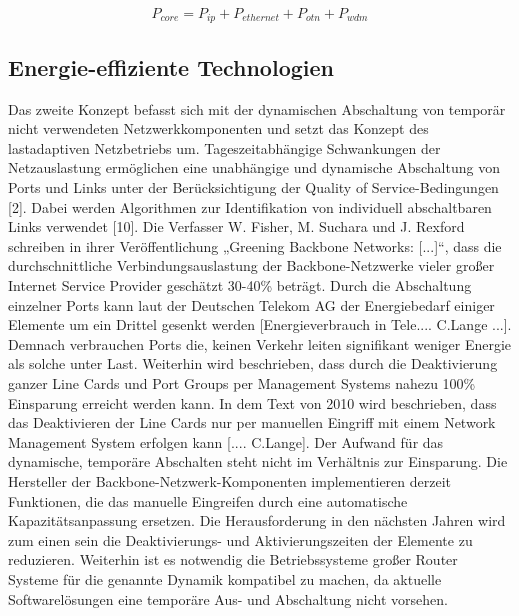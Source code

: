 \documentclass[12pt,titlepage]{article}
\begin{document}
\begin{equation}
P_{core} = P_{ip} + P_{ethernet} + P_{otn} + P_{wdm}
\end{equation}


\subsection{Energie-effiziente Technologien}
Das zweite Konzept befasst sich mit der dynamischen Abschaltung von temporär nicht verwendeten Netzwerkkomponenten und setzt das Konzept des lastadaptiven Netzbetriebs um.  Tageszeitabhängige Schwankungen der Netzauslastung ermöglichen eine unabhängige und dynamische Abschaltung von Ports und Links unter der Berücksichtigung der Quality of Service-Bedingungen [2]. Dabei werden Algorithmen zur Identifikation von individuell abschaltbaren Links verwendet [10]. Die Verfasser W. Fisher, M. Suchara und J. Rexford schreiben in ihrer Veröffentlichung „Greening Backbone Networks: [...]“, dass die durchschnittliche Verbindungsauslastung der Backbone-Netzwerke vieler großer Internet Service Provider geschätzt 30-40\% beträgt. Durch die Abschaltung einzelner Ports kann laut der Deutschen Telekom AG der Energiebedarf einiger Elemente um ein Drittel gesenkt werden [Energieverbrauch in Tele.... C.Lange ...]. Demnach verbrauchen Ports die, keinen Verkehr leiten signifikant weniger Energie als solche unter Last. Weiterhin wird beschrieben, dass durch die Deaktivierung ganzer Line Cards und Port Groups per Management Systems nahezu 100\% Einsparung erreicht werden kann. In dem Text von 2010 wird beschrieben, dass das Deaktivieren der Line Cards nur per manuellen Eingriff mit einem Network Management System erfolgen kann [.... C.Lange]. Der Aufwand für das dynamische, temporäre Abschalten steht nicht im Verhältnis zur Einsparung. Die Hersteller der Backbone-Netzwerk-Komponenten implementieren derzeit Funktionen, die das manuelle Eingreifen durch eine automatische Kapazitätsanpassung ersetzen. Die Herausforderung in den nächsten Jahren wird zum einen sein die Deaktivierungs- und Aktivierungszeiten der Elemente zu reduzieren. Weiterhin ist es notwendig die Betriebssysteme großer Router Systeme für die genannte Dynamik kompatibel zu machen, da aktuelle Softwarelösungen eine temporäre Aus- und Abschaltung nicht vorsehen.
\end{document}
